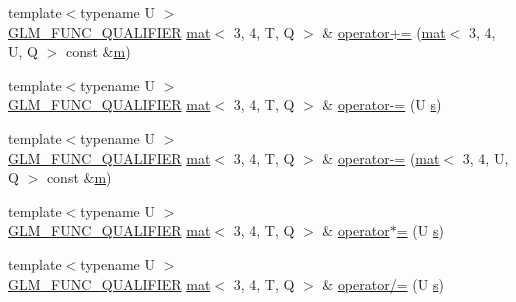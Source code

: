 \begin{DoxyCompactItemize}
\item 
{\footnotesize template$<$typename U $>$ }\\\hyperlink{setup_8hpp_a33fdea6f91c5f834105f7415e2a64407}{G\+L\+M\+\_\+\+F\+U\+N\+C\+\_\+\+Q\+U\+A\+L\+I\+F\+I\+ER} \hyperlink{structglm_1_1mat}{mat}$<$ 3, 4, T, Q $>$ \& \hyperlink{structglm_1_1mat_3_013_00_014_00_01_t_00_01_q_01_4_a34254ab9a3f60274b681b3a1c0a3bf67}{operator+=} (\hyperlink{structglm_1_1mat}{mat}$<$ 3, 4, U, Q $>$ const \&\hyperlink{_s_d_l__opengl__glext_8h_af593500c283bf1a787a6f947f503a5c2}{m})
\item 
{\footnotesize template$<$typename U $>$ }\\\hyperlink{setup_8hpp_a33fdea6f91c5f834105f7415e2a64407}{G\+L\+M\+\_\+\+F\+U\+N\+C\+\_\+\+Q\+U\+A\+L\+I\+F\+I\+ER} \hyperlink{structglm_1_1mat}{mat}$<$ 3, 4, T, Q $>$ \& \hyperlink{structglm_1_1mat_3_013_00_014_00_01_t_00_01_q_01_4_add8deef5c20a96480b2dd587c057ab2a}{operator-\/=} (U \hyperlink{_s_d_l__opengl_8h_a4af680a6c683f88ed67b76f207f2e6e4}{s})
\item 
{\footnotesize template$<$typename U $>$ }\\\hyperlink{setup_8hpp_a33fdea6f91c5f834105f7415e2a64407}{G\+L\+M\+\_\+\+F\+U\+N\+C\+\_\+\+Q\+U\+A\+L\+I\+F\+I\+ER} \hyperlink{structglm_1_1mat}{mat}$<$ 3, 4, T, Q $>$ \& \hyperlink{structglm_1_1mat_3_013_00_014_00_01_t_00_01_q_01_4_a2226def89213f65ec0c850f016191fed}{operator-\/=} (\hyperlink{structglm_1_1mat}{mat}$<$ 3, 4, U, Q $>$ const \&\hyperlink{_s_d_l__opengl__glext_8h_af593500c283bf1a787a6f947f503a5c2}{m})
\item 
{\footnotesize template$<$typename U $>$ }\\\hyperlink{setup_8hpp_a33fdea6f91c5f834105f7415e2a64407}{G\+L\+M\+\_\+\+F\+U\+N\+C\+\_\+\+Q\+U\+A\+L\+I\+F\+I\+ER} \hyperlink{structglm_1_1mat}{mat}$<$ 3, 4, T, Q $>$ \& \hyperlink{structglm_1_1mat_3_013_00_014_00_01_t_00_01_q_01_4_aab8941404df3b9d3243c121f9ba91cc1}{operator$\ast$=} (U \hyperlink{_s_d_l__opengl_8h_a4af680a6c683f88ed67b76f207f2e6e4}{s})
\item 
{\footnotesize template$<$typename U $>$ }\\\hyperlink{setup_8hpp_a33fdea6f91c5f834105f7415e2a64407}{G\+L\+M\+\_\+\+F\+U\+N\+C\+\_\+\+Q\+U\+A\+L\+I\+F\+I\+ER} \hyperlink{structglm_1_1mat}{mat}$<$ 3, 4, T, Q $>$ \& \hyperlink{structglm_1_1mat_3_013_00_014_00_01_t_00_01_q_01_4_ae47ccda80c8464f365fc31bbafb57a17}{operator/=} (U \hyperlink{_s_d_l__opengl_8h_a4af680a6c683f88ed67b76f207f2e6e4}{s})
\end{DoxyCompactItemize}
